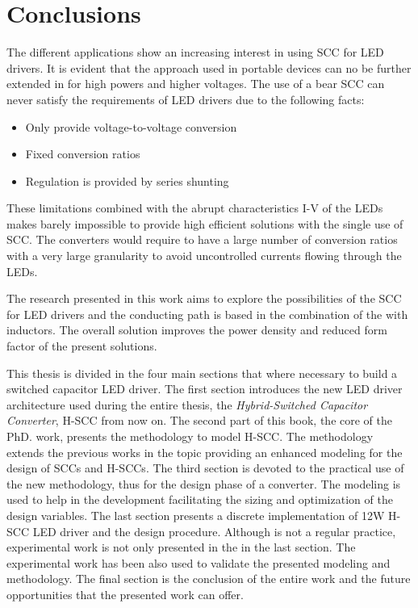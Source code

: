 \section{Conclusions}
The different applications show an increasing interest in using SCC for LED drivers. It is evident that the approach used in portable devices can no be further extended in for high powers and higher voltages. The use of a bear SCC can never satisfy the requirements of LED drivers due to the following facts:
\begin{itemize}
  \item Only provide voltage-to-voltage conversion
  \item Fixed conversion ratios
  \item Regulation is provided by series shunting
\end{itemize}
These limitations combined with the abrupt characteristics I-V of the LEDs makes barely impossible to provide high efficient solutions with the single use of SCC. The converters would require to have a large number of conversion ratios with a very large granularity to avoid uncontrolled currents flowing through the LEDs.

The research presented in this work aims to explore the possibilities of the SCC for LED drivers and the conducting path is based in the combination of the with inductors. The overall solution improves the power density and reduced form factor of the present solutions.


This thesis is divided in the four main sections that where necessary to build a switched capacitor LED driver. The first section introduces the new LED driver architecture used during the entire thesis, the \emph{Hybrid-Switched Capacitor Converter}, H-SCC from now on. The second part of this book, the core of the PhD. work, presents the methodology to model H-SCC. The methodology extends the previous works in the topic providing an enhanced modeling for the design of SCCs and H-SCCs. The third section is devoted to the practical use of the new methodology, thus for the design phase of a converter. The modeling is used  to help in the development facilitating the sizing and optimization of the design variables. The last section presents a discrete implementation of 12W H-SCC LED driver and the design procedure. Although is not a regular practice, experimental work is not only presented in the in the last section. The experimental work has been also  used to validate the presented modeling and methodology. The final section is the conclusion of the entire work and the future opportunities that the presented work can offer.


 